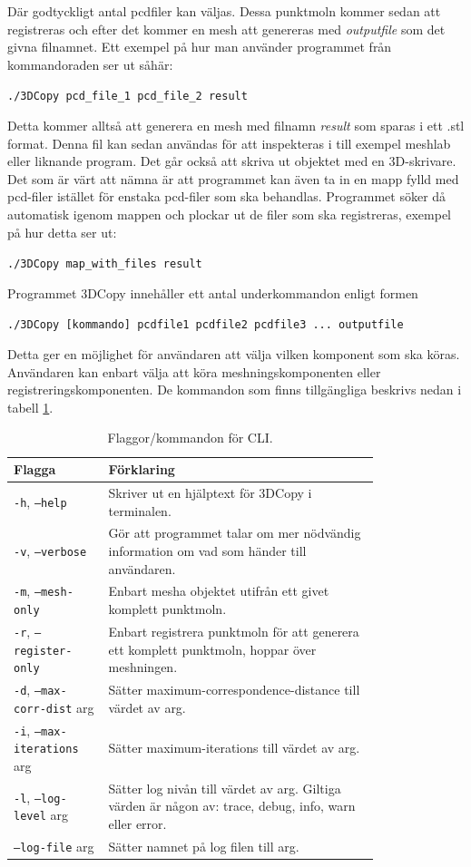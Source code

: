 \documentclass[a4paper,titlepage,12pt]{article}
\begin{document}
		Där godtyckligt antal pcdfiler kan väljas. Dessa punktmoln kommer sedan att registreras och efter det kommer en mesh att genereras med \textit{outputfile} som det givna filnamnet. Ett exempel på hur man använder programmet från kommandoraden ser ut såhär:
		
		\texttt{./3DCopy pcd\_file\_1 pcd\_file\_2 result}
		
		Detta kommer alltså att generera en mesh med filnamn \textit{result} som sparas i ett .stl format. Denna fil kan sedan användas för att inspekteras i till exempel meshlab eller liknande program. Det går också att skriva ut objektet med en 3D-skrivare. Det som är värt att nämna är att programmet kan även ta in en mapp fylld med pcd-filer istället för enstaka pcd-filer som ska behandlas. Programmet söker då automatisk igenom mappen och plockar ut de filer som ska registreras, exempel på hur detta ser ut:
		
		\texttt{./3DCopy map\_with\_files result}
		
		Programmet 3DCopy innehåller ett antal underkommandon enligt formen
		
		\texttt{./3DCopy [kommando] pcdfile1 pcdfile2 pcdfile3 ... outputfile}
		
		Detta ger en möjlighet för användaren att välja vilken komponent som ska köras. Användaren kan enbart välja att köra meshningskomponenten eller registreringskomponenten. De kommandon som finns tillgängliga beskrivs nedan i tabell \ref{tab:flaggor_cli}.
		
		\begin{table}[h!]
			\centering
			\caption{Flaggor/kommandon för CLI.}
			\label{tab:flaggor_cli}
			
			\begin{tabular}{p{0.2\linewidth}p{0.6\linewidth}}
				Flagga & Förklaring \\
				\hline
				\texttt{-h}, \texttt{--help} & Skriver ut en hjälptext för 3DCopy i terminalen. \\
				\hline
				\texttt{-v}, \texttt{--verbose} & Gör att programmet talar om mer nödvändig information om vad som händer till användaren. \\
				\hline
				\texttt{-m}, \texttt{--mesh-only} & Enbart mesha objektet utifrån ett givet komplett punktmoln. \\
				\hline
				\texttt{-r}, \texttt{--register-only} & Enbart registrera punktmoln för att generera ett komplett punktmoln, hoppar över meshningen. \\
				\hline
				\texttt{-d}, \texttt{--max-corr-dist} arg & Sätter maximum-correspondence-distance till värdet av arg. \\
				\hline
				\texttt{-i}, \texttt{--max-iterations} arg & Sätter maximum-iterations till värdet av arg. \\
				\hline
				\texttt{-l}, \texttt{--log-level} arg & Sätter log nivån till värdet av arg. Giltiga värden är någon av: trace, debug, info, warn eller error. \\
				\hline
				\texttt{--log-file} arg & Sätter namnet på log filen till arg. \\
				\hline
			\end{tabular}
		\end{table}	
		
\end{document}
